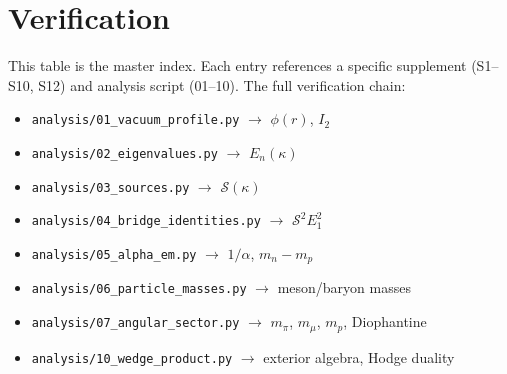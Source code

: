 \documentclass[11pt,letterpaper]{article}
\numberwithin{equation}{section}
\begin{document}
\section{Verification}
\label{sec:verification}

This table is the master index. Each entry references a specific supplement
(S1--S10, S12) and analysis script (01--10). The full verification chain:
\begin{itemize}
  \item \texttt{analysis/01\_vacuum\_profile.py} $\to$ $\phi(r)$, $I_2$
  \item \texttt{analysis/02\_eigenvalues.py} $\to$ $E_n(\kappa)$
  \item \texttt{analysis/03\_sources.py} $\to$ $\mathcal{S}(\kappa)$
  \item \texttt{analysis/04\_bridge\_identities.py} $\to$ $\mathcal{S}^2 E_1^2$
  \item \texttt{analysis/05\_alpha\_em.py} $\to$ $1/\alpha$, $m_n - m_p$
  \item \texttt{analysis/06\_particle\_masses.py} $\to$ meson/baryon masses
  \item \texttt{analysis/07\_angular\_sector.py} $\to$ $m_\pi$, $m_\mu$, $m_p$, Diophantine
  \item \texttt{analysis/10\_wedge\_product.py} $\to$ exterior algebra, Hodge duality
\end{itemize}
\end{document}
